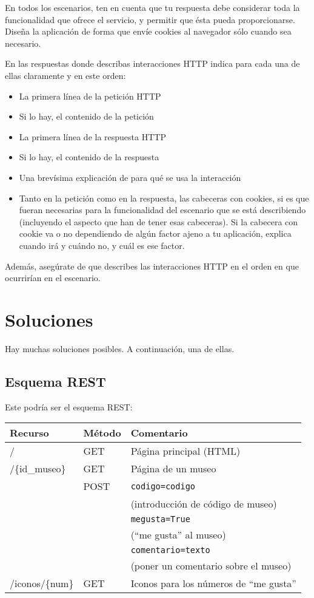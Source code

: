 En todos los escenarios, ten en cuenta que tu respuesta debe considerar toda la funcionalidad que ofrece el servicio, y permitir que ésta pueda proporcionarse. Diseña la aplicación de forma que envíe cookies al navegador sólo cuando sea necesario.

En las respuestas donde describas interacciones HTTP indica para cada una de ellas claramente y en este orden:
  \begin{itemize}
  \item La primera línea de la petición HTTP
  \item Si lo hay, el contenido de la petición
  \item La primera línea de la respuesta HTTP
  \item Si lo hay, el contenido de la respuesta
  \item Una brevísima explicación de para qué se usa la interacción
  \item Tanto en la petición como en la respuesta, las cabeceras con cookies, si es que fueran necesarias para la funcionalidad del escenario que se está describiendo (incluyendo el aspecto que han de tener esas cabeceras). Si la cabecera con cookie va o no dependiendo de algún factor ajeno a tu aplicación, explica cuando irá y cuándo no, y cuál es ese factor.
  \end{itemize}

Además, asegúrate de que describes las interacciones HTTP en el orden en que ocurrirían en el escenario.

\section*{Soluciones}

Hay muchas soluciones posibles. A continuación, una de ellas.

\subsection*{Esquema REST}

Este podría ser el esquema REST:

\begin{tabular}{|l|l|l|}
  \hline
  Recurso & Método & Comentario \\ \hline \hline
  /       & GET    & Página principal (HTML) \\ \hline
  /\{id\_museo\} & GET   & Página de un museo \\
          & POST   & \verb|codigo=codigo| \\
          &        & (introducción de código de museo) \\
          &        & \verb|megusta=True| \\
          &        & (``me gusta'' al museo) \\
          &        & \verb|comentario=texto| \\
          &        & (poner un comentario sobre el museo) \\ \hline
  /iconos/\{num\} & GET & Iconos para los números de ``me gusta'' \\ \hline
\end{tabular}

